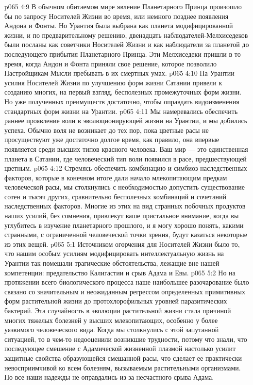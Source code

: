 \vs p065 4:9 В обычном обитаемом мире явление Планетарного Принца произошло бы по запросу Носителей Жизни во время, или немного позднее появления Андона и Фонты. Но Урантия была выбрана как планета модифицированной жизни, и по предварительному решению, двенадцать наблюдателей\hyp{}Мелхиседеков были посланы как советчики Носителей Жизни и как наблюдатели за планетой до последующего прибытия Планетарного Принца. Эти Мелхиседеки пришли в то время, когда Андон и Фонта приняли свое решение, которое позволило Настройщикам Мысли пребывать в их смертных умах.
\vs p065 4:10 \pc На Урантии усилия Носителей Жизни по улучшению форм жизни Сатании привели к созданию многих, на первый взгляд, бесполезных промежуточных форм жизни. Но уже полученных преимуществ достаточно, чтобы оправдать видоизменения стандартных форм жизни на Урантии.
\vs p065 4:11 Мы намеревались обеспечить раннее проявление воли в эволюционирующей жизни на Урантии, и мы добились успеха. Обычно воля не возникает до тех пор, пока цветные расы не просуществуют уже достаточно долгое время, как правило, она впервые появляется среди высших типов красного человека. Ваш мир --- это единственная планета в Сатании, где человеческий тип воли появился в расе, предшествующей цветным.
\vs p065 4:12 Стремясь обеспечить комбинацию и симбиоз наследственных факторов, которые в конечном итоге дали начало млекопитающим предкам человеческой расы, мы столкнулись с необходимостью допустить существование сотен и тысяч других, сравнительно бесполезных комбинаций и сочетаний наследственных факторов. Многие из этих на вид странных побочных продуктов наших усилий, без сомнения, привлекут ваше пристальное внимание, когда вы углубитесь в изучение планетарного прошлого, и я могу хорошо понять, какими странными, с ограниченной человеческой точки зрения, будут казаться некоторые из этих вещей.
\vs p065 5:1 Источником огорчения для Носителей Жизни было то, что нашим особым усилиям модифицировать интеллектуальную жизнь на Урантии так помешали трагические обстоятельства, лежащие вне нашей компетенции: предательство Калигастии и срыв Адама и Евы.
\vs p065 5:2 Но на протяжении всего биологического процесса наше наибольшее разочарование было связано со значительным и неожиданным регрессом определенных примитивных форм растительной жизни до протохлорофильных уровней паразитических бактерий. Эта случайность в эволюции растительной жизни стала причиной многих тяжелых болезней у высших млекопитающих, особенно у более уязвимого человеческого вида. Когда мы столкнулись с этой запутанной ситуацией, то в чем\hyp{}то недооценили возникшие трудности, потому что знали, что последующее смешение с Адамической жизненной плазмой настолько усилит защитные свойства образующейся смешанной расы, что сделает ее практически невосприимчивой ко всем болезням, вызываемым растительными организмами. Но все наши надежды не оправдались из\hyp{}за несчастного срыва Адама.
